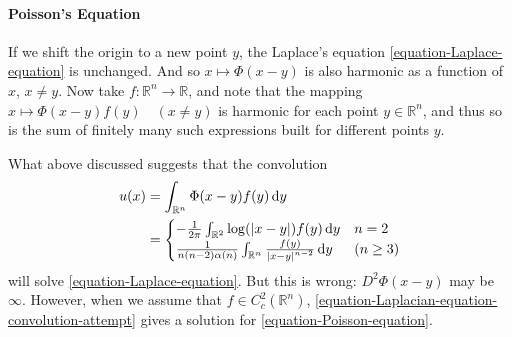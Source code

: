 \paragraph{Poisson's Equation}
If we shift the origin to a new point \( y \), the Laplace's equation \eqref{equation-Laplace-equation} is unchanged.
And so \( x \mapsto \Phi(x - y) \) is also harmonic as a function of \( x \), \( x \neq y \).
Now take \( f: \mathbb{R}^n \to \mathbb{R} \), and note that the mapping \( x \mapsto \Phi(x - y) f(y)\quad(x \neq y) \) is harmonic for each point \( y \in \mathbb{R}^n \), and thus so is the sum of finitely many such expressions built for different points \( y \).

What above discussed suggests that the convolution
\begin{equation}
  \begin{aligned}
    u(x) &= \int_{\mathbb{R}^n} \Phi(x - y) f(y) \mathop{}\!\mathrm{d} y\\
         &= \begin{cases}
           -\frac{1}{2 \pi} \int_{\mathbb{R}^2} \log (\left\lvert x - y \right\rvert) f(y) \mathop{}\!\mathrm{d} y & n = 2\\
           \frac{1}{n(n - 2)\alpha(n)} \int_{\mathbb{R}^n} \frac{f(y)}{\left\lvert x - y \right\rvert^{n - 2}}\mathop{}\!\mathrm{d} y & (n \geq 3)
         \end{cases}
  \end{aligned}
  \label{equation-Laplacian-equation-convolution-attempt}
\end{equation}
will solve \eqref{equation-Laplace-equation}.
But this is wrong: \( D^2 \Phi(x - y) \) may be \( \infty \).
However, when we assume that \( f \in C^2_c(\mathbb{R}^n) \), \eqref{equation-Laplacian-equation-convolution-attempt} gives a solution for \eqref{equation-Poisson-equation}.

